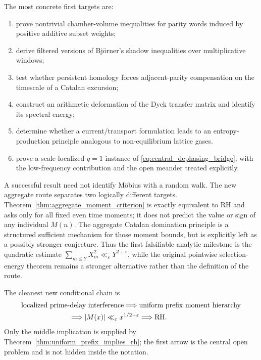 \documentclass[11pt]{amsart}
\numberwithin{equation}{section}
\theoremstyle{plain}
\theoremstyle{definition}
\theoremstyle{remark}
\newcommand{\Mert}{M}
\newcommand{\eps}{\varepsilon}
\begin{document}
The most concrete first targets are:
\begin{enumerate}[label=(\roman*)]
\item prove nontrivial chamber-volume inequalities for parity words induced by positive additive subset weights;
\item derive filtered versions of Bj\"orner's shadow inequalities over multiplicative windows;
\item test whether persistent homology forces adjacent-parity compensation on the timescale of a Catalan excursion;
\item construct an arithmetic deformation of the Dyck transfer matrix and identify its spectral energy;
\item determine whether a current/transport formulation leads to an entropy-production principle analogous to non-equilibrium lattice gases.
\item prove a scale-localized $q=1$ instance of
      \eqref{eq:central_dephasing_bridge}, with the low-frequency contribution
      and the open meander treated explicitly.
\end{enumerate}

A successful result need not identify M\"obius with a random walk.  The new
aggregate route separates two logically different targets.  Theorem~\ref{thm:aggregate_moment_criterion}
is exactly equivalent to RH and asks only for all fixed even time moments; it
does not predict the value or sign of any individual $M(n)$.  The aggregate
Catalan domination principle is a structured sufficient mechanism for those
moment bounds, but is explicitly left as a possibly stronger conjecture.  Thus
the first falsifiable analytic milestone is the quadratic estimate
$\sum_{m\le Y}X_m^2\ll_\varepsilon Y^{2+\varepsilon}$, while the original
pointwise selection-energy theorem remains a stronger alternative rather than
the definition of the route.

The cleanest new conditional chain is
\begin{equation}
\begin{aligned}
&\text{localized prime-delay interference}
\Longrightarrow
\text{uniform prefix moment hierarchy}\\
&\hspace{24mm}\Longrightarrow
|\Mert(x)|\ll_\eps x^{1/2+\eps}
\Longrightarrow \mathrm{RH}.
\end{aligned}
\end{equation}
Only the middle implication is supplied by
Theorem~\ref{thm:uniform_prefix_implies_rh}; the first arrow is the central
open problem and is not hidden inside the notation.
\end{document}
